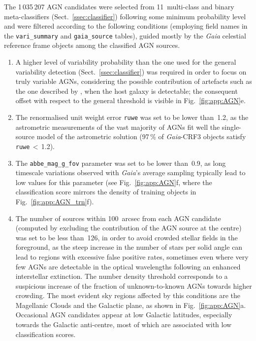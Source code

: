 \documentclass[longauth]{aa}
\def\gaia{\textit{Gaia}\xspace}
\begin{document}
The 1\,035\,207 AGN candidates were selected from 11~multi-class and binary meta-classifiers (Sect.~\ref{ssec:classifier}) following some minimum probability level and were filtered according to the following conditions (employing field names in the \texttt{vari\_summary} and \texttt{gaia\_source} tables), guided mostly by the \gaia celestial reference frame objects \citep[\gaia-CRF3;][]{EDR3-DPACP-133} among the classified AGN sources.
\begin{enumerate} 
    \item A higher level of variability probability than the one used for the general variability detection (Sect.~\ref{ssec:classifier}) was required in order to focus on truly variable AGNs, considering the possible contribution of artefacts such as the one described by \citet{DR3-DPACP-164}, when the host galaxy is detectable; the consequent offset with respect to the general threshold is visible in Fig.~\ref{fig:app:AGN}e.
    \item The renormalised unit weight error \texttt{ruwe} was set to be lower than~1.2, as the astrometric measurements of the vast majority of AGNs fit well the single-source model of the astrometric solution (97\,\% of \gaia-CRF3 objects satisfy \texttt{ruwe}\,$<$\,1.2). 
    \item The \texttt{abbe\_mag\_g\_fov} parameter was set to be lower than~0.9, as long timescale variations observed with \gaia's average sampling typically lead to low values for this parameter (see Fig.~\ref{fig:app:AGN}f, where the classification score mirrors the density of training objects in Fig.~\ref{fig:app:AGN_trn}f).
    \item The number of sources within 100~arcsec from each AGN candidate (computed by excluding the contribution of the AGN source at the centre) was set to be less than~126, in order to avoid crowded stellar fields in the foreground, as the steep increase in the number of stars per solid angle can lead to regions with excessive false positive rates, sometimes even where very few AGNs are detectable in the optical wavelengths following an enhanced interstellar extinction. The number density threshold corresponds to a suspicious increase of the fraction of unknown-to-known AGNs towards higher crowding. The most evident sky regions affected by this conditions are the Magellanic Clouds and the Galactic plane, as shown in Fig.~\ref{fig:app:AGN}a. Occasional AGN candidates appear at low Galactic latitudes, especially towards the Galactic anti-centre, most of which are associated with low classification scores.

\end{enumerate}
\end{document}
